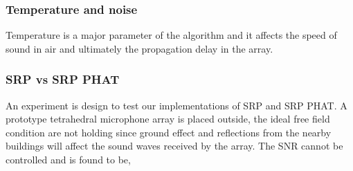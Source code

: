 \subsubsection{Temperature and noise}

Temperature is a major parameter of the algorithm and it affects the speed of sound in air and ultimately the propagation delay in the array.



\subsubsection{SRP vs SRP PHAT}

An experiment is design to test our implementations of SRP and SRP PHAT. A prototype tetrahedral microphone array is placed outside, the ideal free field condition are not holding since ground effect and reflections from the nearby buildings will affect the sound waves received by the array. The SNR cannot be controlled and is found to be, 

